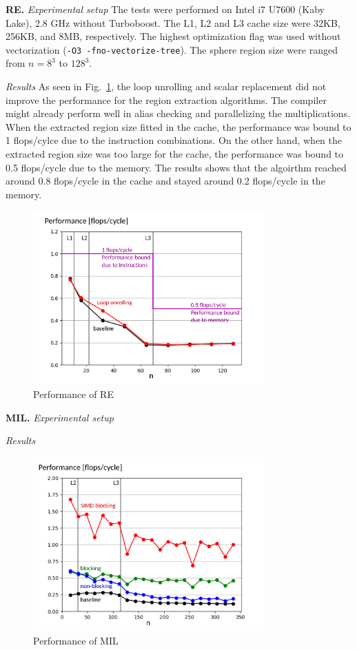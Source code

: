 \documentclass[letterpaper]{article}
\newcommand{\mypar}[1]{{\bf #1.}}
\begin{document}
\mypar{RE} \textit{Experimental setup} The tests were performed on Intel i7 U7600 (Kaby Lake), 2.8 GHz without Turboboost. The L1, L2 and L3 cache size were 32KB, 256KB, and 8MB, respectively. The highest optimization flag was used without vectorization (\texttt{-O3 -fno-vectorize-tree}). The sphere region size were ranged from $n=8^{3}$ to $128^{3}$.

\textit{Results} As seen in Fig.~\ref{res:regions}, the loop unrolling and scalar replacement did not improve the performance for the region extraction algorithms. The compiler might already perform well in alias checking and parallelizing the multiplications. When the extracted region size fitted in the cache, the performance was bound to 1 flops/cylce due to the instruction combinations. On the other hand, when the extracted region size was too large for the cache, the performance was bound to 0.5 flops/cycle due to the memory. The results shows that the algoirthm reached around 0.8 flops/cycle in the cache and stayed around 0.2 flops/cycle in the memory.
   
\begin{figure}[H]
  \centering
 
  \includegraphics[width=3.5in]{figs/plots/regions/regions_performance.pdf}
  \caption{Performance of RE}
  \label{res:regions}
\end{figure}


\mypar{MIL} \textit{Experimental setup}

\textit{Results}

\begin{figure}[H]
  \centering
  \includegraphics[width=3.5in]{figs/plots/mil/mil_performance.pdf}
  \caption{Performance of MIL}
  \label{res:mil}
\end{figure}
\end{document}
